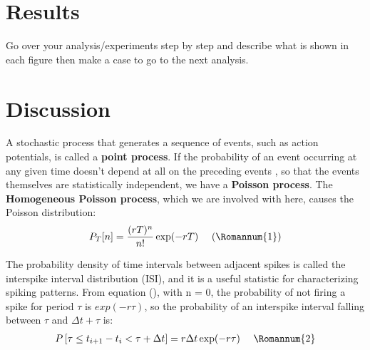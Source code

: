\documentclass[9pt,twocolumn]{paper-template}
\begin{document}
\section*{Results}
Go over your analysis/experiments step by step and
describe what is shown in each figure then make a case
to go to the next analysis.\\


\section*{Discussion}
A stochastic process that generates a sequence of events, such as action
potentials, is called a \textbf{point process}. If the probability of an event occurring at any given time doesn't depend at all on the preceding events , so that the events themselves are statistically independent, we have a \textbf{Poisson process}. The \textbf{Homogeneous Poisson process}, which we are involved with here, causes the Poisson distribution:
\begin{gather*}
P_{T}[n]=\frac{(r T)^{n}}{n !} \exp (-r T)\ \ \ \ (\Romannum{1})
\end{gather*}

The probability density of time intervals between adjacent spikes is called the interspike interval distribution (ISI), and it is a useful statistic for characterizing spiking patterns. From equation (), with n = 0, the probability of not firing a spike for period $ \tau $ is $ exp(-r\tau) $, so the probability of an interspike interval falling
between $ \tau $ and $ \Delta t + \tau $ is:
\begin{gather*}
P\left[\tau \leq t_{i+1}-t_{i}<\tau+\Delta t\right]=r \Delta t \exp (-r \tau)\ \ \ \ \Romannum{2}
\end{gather*}
\end{document}
